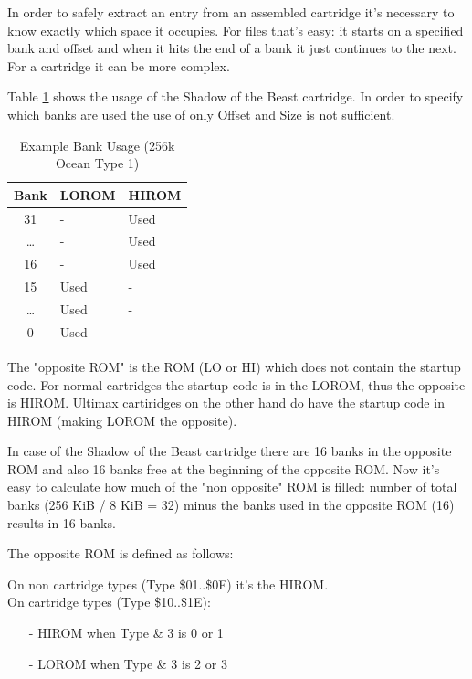 \documentclass[a4paper,oneside]{memoir}
\begin{document}
In order to safely extract an entry from an assembled cartridge it's
necessary to know exactly which space it occupies. For files that's easy:
it starts on a specified bank and offset and when it hits the end of a bank
it just continues to the next. For a cartridge it can be more complex.

Table \ref{tab:bank-usage-oc1-256k} shows the usage of the Shadow of the Beast cartridge.
In order to specify which banks are used the use of only Offset and Size is not sufficient.

\begin{table}[!htbp]
    \centering
    \begin{tabularx}{0.6\textwidth}{c|X|X}
        \toprule
        Bank & LOROM & HIROM \\
        \midrule
        31 & - & Used \\
        \ldots & - & Used \\
        16 & - & Used \\
        15 & Used & - \\
        \ldots & Used & - \\
        0 & Used & - \\
        \bottomrule
    \end{tabularx}
    \caption{Example Bank Usage (256k Ocean Type 1)}
    \label{tab:bank-usage-oc1-256k}
\end{table}

The "opposite ROM" is the ROM (LO or HI) which does not contain the startup code.
For normal cartridges the startup code is in the LOROM, thus the opposite is HIROM.
Ultimax cartiridges on the other hand do have the startup code in HIROM
(making LOROM the opposite).

In case of the Shadow of the Beast cartridge
there are 16 banks in the opposite ROM and also 16 banks free at the
beginning of the opposite ROM. Now it's easy to calculate how much of the
"non opposite" ROM is filled: number of total banks (256 KiB / 8 KiB = 32)
minus the banks used in the opposite ROM (16) results in 16 banks.

The opposite ROM is defined as follows:

On non cartridge types (Type \$01..\$0F) it's the HIROM.\\
On cartridge types (Type \$10..\$1E):
\begin{itemize}
\item[-] HIROM when Type \& 3 is 0 or 1
\item[-] LOROM when Type \& 3 is 2 or 3
\end{itemize}
\end{document}
